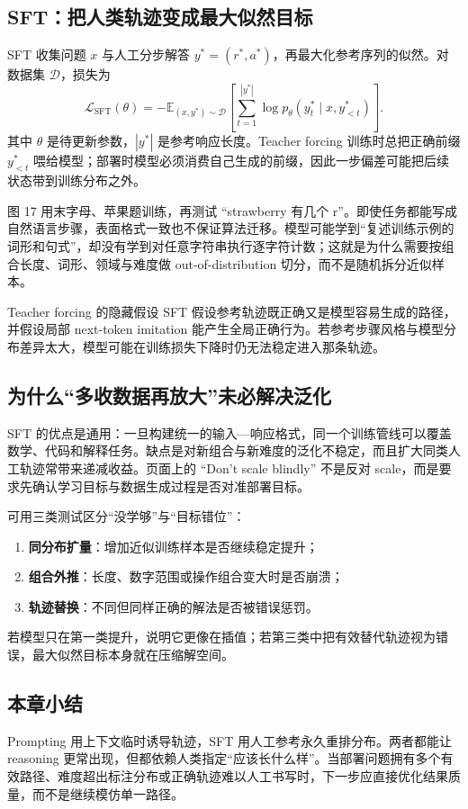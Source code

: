 \subsection{SFT：把人类轨迹变成最大似然目标}

SFT 收集问题 $x$ 与人工分步解答 $y^*=(r^*,a^*)$，再最大化参考序列的似然。对数据集 $\mathcal D$，损失为
\[
\mathcal L_{\text{SFT}}(\theta)
=-\mathbb E_{(x,y^*)\sim\mathcal D}
\left[\sum_{t=1}^{|y^*|}\log p_\theta(y_t^*\mid x,y_{<t}^*)\right].
\]
其中 $\theta$ 是待更新参数，$|y^*|$ 是参考响应长度。Teacher forcing 训练时总把正确前缀 $y_{<t}^*$ 喂给模型；部署时模型必须消费自己生成的前缀，因此一步偏差可能把后续状态带到训练分布之外。



图 17 用末字母、苹果题训练，再测试 “strawberry 有几个 r”。即使任务都能写成自然语言步骤，表面格式一致也不保证算法迁移。模型可能学到“复述训练示例的词形和句式”，却没有学到对任意字符串执行逐字符计数；这就是为什么需要按组合长度、词形、领域与难度做 out-of-distribution 切分，而不是随机拆分近似样本。

\begin{warningbox}{Teacher forcing 的隐藏假设}
SFT 假设参考轨迹既正确又是模型容易生成的路径，并假设局部 next-token imitation 能产生全局正确行为。若参考步骤风格与模型分布差异太大，模型可能在训练损失下降时仍无法稳定进入那条轨迹。
\end{warningbox}

\subsection{为什么“多收数据再放大”未必解决泛化}

SFT 的优点是通用：一旦构建统一的输入—响应格式，同一个训练管线可以覆盖数学、代码和解释任务。缺点是对新组合与新难度的泛化不稳定，而且扩大同类人工轨迹常带来递减收益。页面上的 “Don't scale blindly” 不是反对 scale，而是要求先确认学习目标与数据生成过程是否对准部署目标。



可用三类测试区分“没学够”与“目标错位”：
\begin{enumerate}
  \item \textbf{同分布扩量}：增加近似训练样本是否继续稳定提升；
  \item \textbf{组合外推}：长度、数字范围或操作组合变大时是否崩溃；
  \item \textbf{轨迹替换}：不同但同样正确的解法是否被错误惩罚。
\end{enumerate}
若模型只在第一类提升，说明它更像在插值；若第三类中把有效替代轨迹视为错误，最大似然目标本身就在压缩解空间。

\subsection{本章小结}

Prompting 用上下文临时诱导轨迹，SFT 用人工参考永久重排分布。两者都能让 reasoning 更常出现，但都依赖人类指定“应该长什么样”。当部署问题拥有多个有效路径、难度超出标注分布或正确轨迹难以人工书写时，下一步应直接优化结果质量，而不是继续模仿单一路径。

